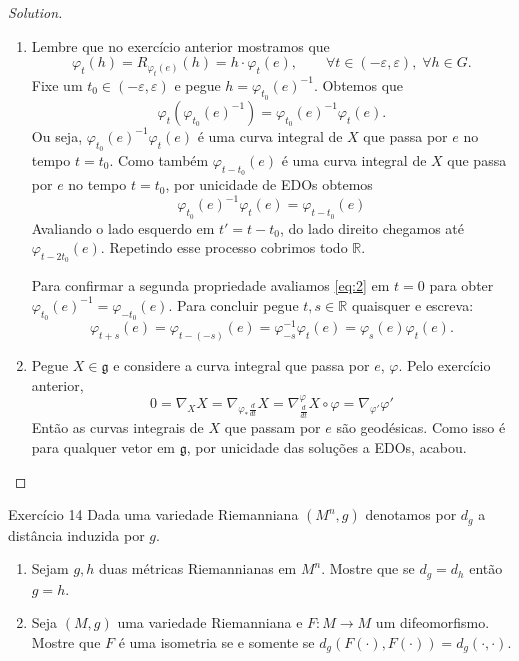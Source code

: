 \begin{proof}[Solution]\leavevmode
\begin{enumerate}[label=(\alph*)]
\item Lembre que no exercício anterior mostramos que
	\[\varphi_t(h)=R_{\varphi_t(e)}(h)=h\cdot \varphi_t(e),\qquad \forall t \in (-\varepsilon,\varepsilon),\;\forall h \in G.\]
	Fixe um \(t_0 \in (-\varepsilon,\varepsilon)\) e pegue \(h=\varphi_{t_0}(e)^{-1}\). Obtemos que
	\[\varphi_t(\varphi_{t_0}(e)^{-1})=\varphi_{t_0}(e)^{-1}\varphi_t(e).\]
Ou seja,  \(\varphi_{t_0}(e)^{-1}\varphi_t(e)\) é uma curva integral de \(X\) que passa por \(e\) no tempo \(t=t_0\). Como também \(\varphi_{t-t_0}(e)\) é uma curva integral de \(X\) que passa por \(e\) no tempo \(t=t_0\), por unicidade de EDOs obtemos
\begin{equation}\label{eq:2}
\varphi_{t_0}(e)^{-1}\varphi_t(e)=\varphi_{t-t_0}(e)
\end{equation}
Avaliando o lado esquerdo em \(t'=t-t_0\), do lado direito chegamos até \(\varphi_{t-2t_0}(e)\). Repetindo esse processo cobrimos todo \(\mathbb{R}\).

Para confirmar a segunda propriedade avaliamos \cref{eq:2} em \(t=0\) para obter \(\varphi_{t_0}(e)^{-1}=\varphi_{-t_0}(e)\). Para concluir pegue  \(t,s \in \mathbb{R}\) quaisquer e escreva:
\[\varphi_{t+s}(e)=\varphi_{t-(-s)}(e)=\varphi_{-s}^{-1}\varphi_t(e)=\varphi_s(e)\varphi_t(e).\]

\item Pegue \(X \in \mathfrak{g}\) e considere a curva integral que passa por \(e\), \(\varphi\). Pelo exercício anterior,
\[0=\nabla_X X=\nabla_{\varphi_*\frac{d}{dt}}X=\nabla_{\frac{d}{dt}}^\varphi X \circ \varphi=\nabla_{\varphi'}\varphi'\]
Então as curvas integrais de \(X\) que passam por \(e\) são geodésicas. Como isso é para qualquer vetor em \(\mathfrak{g}\), por unicidade das soluções a EDOs, acabou.
\end{enumerate}
\end{proof}

\clearpage
\begin{thing4}{Exercício 14}\label{exer:14}\leavevmode
Dada uma variedade Riemanniana \((M^n,g)\) denotamos por \(d_g\) a distância induzida por \(g\).
\begin{enumerate}[label=(\alph*)]
\item Sejam \(g,h\) duas métricas Riemannianas em \(M^n\). Mostre que se \(d_g=d_h\) então \(g=h\).
\item Seja \((M,g)\) uma variedade Riemanniana e \(F:M \to M\) um difeomorfismo. Mostre que \(F\) é uma isometria se e somente se \(d_g(F(\cdot),F(\cdot))=d_g(\cdot,\cdot)\).
\end{enumerate}
\end{thing4}

